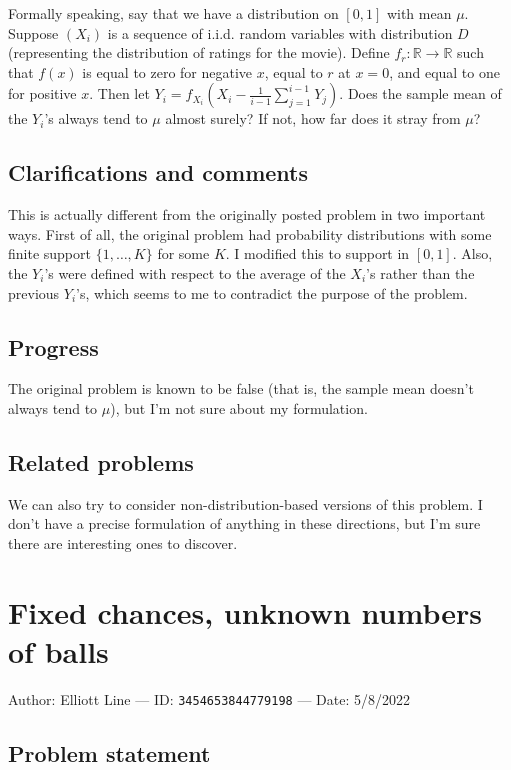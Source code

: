 \documentclass[10pt]{article}
\begin{document}
Formally speaking, say that we have a distribution on $[0,1]$ with mean $\mu$. Suppose $(X_i)$ is a sequence of i.i.d. random variables with distribution $D$ (representing the distribution of ratings for the movie). Define $f_r:\mathbb{R}\to\mathbb{R}$ such that $f(x)$ is equal to zero for negative $x$, equal to $r$ at $x=0$, and equal to one for positive $x$. Then let $Y_i=f_{X_i}(X_i-\frac{1}{i-1}\sum_{j=1}^{i-1}Y_j)$. Does the sample mean of the $Y_i$'s always tend to $\mu$ almost surely? If not, how far does it stray from $\mu$?

\subsection{Clarifications and comments}

This is actually different from the originally posted problem in two important ways. First of all, the original problem had probability distributions with some finite support $\{1,\ldots,K\}$ for some $K$. I modified this to support in $[0,1]$. Also, the $Y_i$'s were defined with respect to the average of the $X_i$'s rather than the previous $Y_i$'s, which seems to me to contradict the purpose of the problem.

\subsection{Progress}

The original problem is known to be false (that is, the sample mean doesn't always tend to $\mu$), but I'm not sure about my formulation.

\subsection{Related problems}

We can also try to consider non-distribution-based versions of this problem. I don't have a precise formulation of anything in these directions, but I'm sure there are interesting ones to discover.

\pagebreak

\section{Fixed chances, unknown numbers of balls}

Author: Elliott Line --- ID: \verb`3454653844779198` --- Date: 5/8/2022

\subsection{Problem statement}
\end{document}
